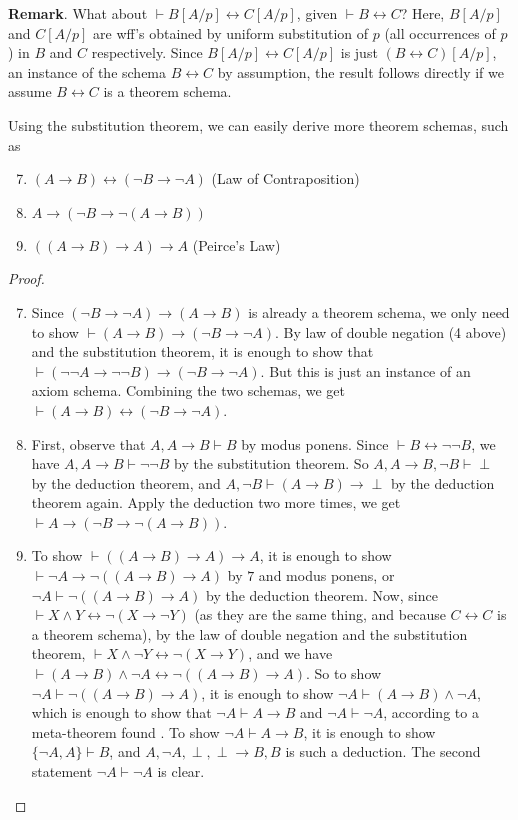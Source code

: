 \documentclass[12pt]{article}
\begin{document}
\textbf{Remark}.  What about $\vdash B[A/p]\leftrightarrow C[A/p]$, given $\vdash B\leftrightarrow C$?  Here, $B[A/p]$ and $C[A/p]$ are wff's obtained by uniform substitution of $p$ (all occurrences of $p$) in $B$ and $C$ respectively.  Since $B[A/p] \leftrightarrow C[A/p]$ is just $(B\leftrightarrow C)[A/p]$, an instance of the schema $B\leftrightarrow C$ by assumption, the result follows directly if we assume $B\leftrightarrow C$ is a theorem schema.

Using the substitution theorem, we can easily derive more theorem schemas, such as
\begin{enumerate}
\setcounter{enumi}{6}
\item $(A\to B)\leftrightarrow (\neg B\to \neg A)$ (Law of Contraposition)
\item $A \to (\neg B \to \neg (A \to B))$
\item $((A\to B)\to A)\to A$ (Peirce's Law)
\end{enumerate}

\begin{proof}
\begin{enumerate}
\setcounter{enumi}{6}
\item Since $(\neg B\to \neg A)\to (A\to B)$ is already a theorem schema, we only need to show $\vdash (A\to B) \to (\neg B \to \neg A)$.  By law of double negation (4 above) and the substitution theorem, it is enough to show that $\vdash (\neg \neg A \to \neg \neg B) \to (\neg B \to \neg A)$.  But this is just an instance of an axiom schema.  Combining the two schemas, we get $\vdash (A\to B)\leftrightarrow (\neg B\to \neg A)$.
\item First, observe that $A,A\to B\vdash B$ by modus ponens.  Since $\vdash B\leftrightarrow \neg \neg B$, we have $A,A\to B\vdash \neg \neg B$ by the substitution theorem.  So $A,A\to B, \neg B\vdash \perp$ by the deduction theorem, and $A,\neg B\vdash (A\to B)\to \perp$ by the deduction theorem again.  Apply the deduction two more times, we get $\vdash A \to (\neg B \to \neg (A \to B))$.
\item To show $\vdash ((A\to B)\to A)\to A$, it is enough to show $\vdash \neg A \to \neg ((A\to B)\to A)$ by $7$ and modus ponens, or $\neg A \vdash \neg ((A\to B)\to A)$ by the deduction theorem.  Now, since $\vdash X\land Y \leftrightarrow \neg (X \to \neg Y)$ (as they are the same thing, and because $C\leftrightarrow C$ is a theorem schema), by the law of double negation and the substitution theorem, $\vdash X \land \neg Y \leftrightarrow \neg (X\to Y)$, and we have $\vdash (A\to B)\land \neg A \leftrightarrow \neg ((A\to B)\to A)$.  So to show $\neg A \vdash \neg ((A\to B)\to A)$, it is enough to show $\neg A \vdash (A\to B)\land \neg A$, which is enough to show that $\neg A \vdash A\to B$ and $\neg A \vdash \neg A$, according to a meta-theorem found .  To show $\neg A \vdash A\to B$, it is enough to show $\lbrace \neg A, A\rbrace \vdash B$, and $A, \neg A, \perp, \perp \to B, B$ is such a deduction.  The second statement $\neg A \vdash \neg A$ is clear.
\end{enumerate}
\end{proof}
\end{document}
